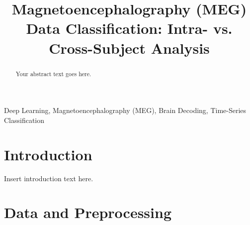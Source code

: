 \documentclass[conference]{IEEEtran}
\begin{document}
\title{Magnetoencephalography (MEG) Data Classification: Intra- vs. Cross-Subject Analysis}

\author{
\and
{}
\and
{}
\and
{}
}

\maketitle

\begin{abstract}
Your abstract text goes here.
\end{abstract}

\begin{IEEEkeywords}
Deep Learning, Magnetoencephalography (MEG), Brain Decoding, Time-Series Classification
\end{IEEEkeywords}

\section{Introduction}
Insert introduction text here.

\section{Data and Preprocessing}
\end{document}
